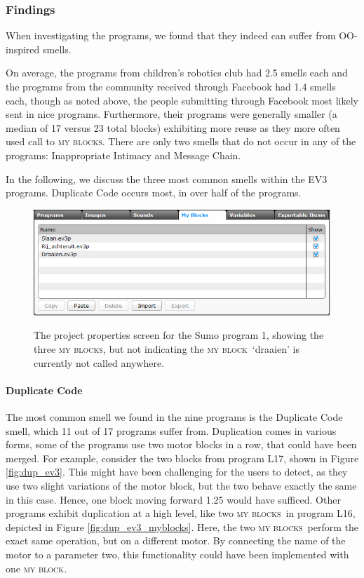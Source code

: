 \documentclass{sig-alternate}
\newcommand{\mbs}{\textsc{my blocks}}
\newcommand{\mb}{\textsc{my block}}
\begin{document}
\subsubsection{Findings}
When investigating the programs, we found that they indeed can suffer from OO-inspired smells. 

On average, the programs from children's robotics club had 2.5 smells each and the programs from the community received through Facebook had 1.4 smells each, though as noted above, the people submitting through Facebook most likely sent in nice programs. Furthermore, their programs were generally smaller (a median of 17 versus 23 total blocks) exhibiting more reuse as they more often used call to \mbs. There are only two smells that do not occur in any of the programs: Inappropriate Intimacy and Message Chain.

In the following, we discuss the three most common smells within the EV3 programs. Duplicate Code occurs most, in over half of the programs. 

\begin{figure} [ht]
\caption{The project properties screen for the Sumo program 1, showing the three \mbs, but not indicating the \mb~`draaien' is currently not called anywhere.}
\centering
\includegraphics[width=\columnwidth]{img/overview-small}
\label{fig:overview}
\end{figure}

\paragraph{Duplicate Code}
The most common smell we found in the nine programs is the Duplicate Code smell, which 11 out of 17 programs suffer from. Duplication comes in various forms, some of the programs use two motor blocks in a row, that could have been merged. For example, consider the two blocks from program L17, shown in Figure \ref{fig:dup_ev3}. This might have been challenging for the users to detect, as they use two slight variations of the motor block, but the two behave exactly the same in this case. Hence, one block moving forward 1.25 would have sufficed. Other programs exhibit duplication at a high level, like two \mbs~in program L16, depicted in Figure \ref{fig:dup_ev3_myblocks}. Here, the two \mbs~perform the exact same operation, but on a different motor. By connecting the name of the motor to a parameter two, this functionality could have been implemented with one \mb.
\end{document}
